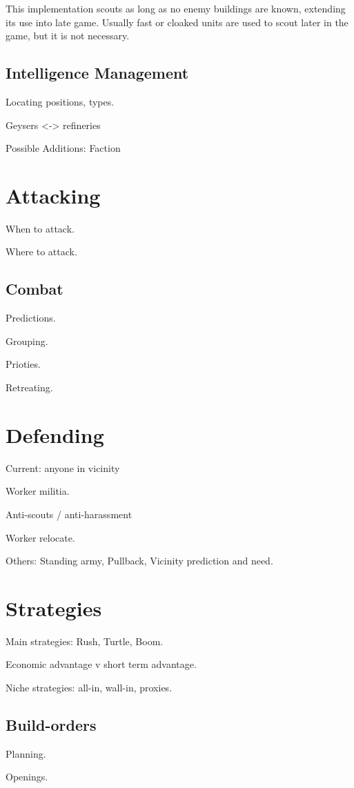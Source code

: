 		This implementation scouts as long as no enemy buildings are known, extending its use into late game. Usually fast or cloaked units are used to scout later in the game, but it is not necessary.
		
	\subsection{Intelligence Management}
	
	Locating positions, types.
	
	Geysers <-> refineries
	
	Possible Additions: Faction

\section{Attacking}

When to attack.

Where to attack.

	\subsection{Combat}
	
	Predictions.
	
	Grouping.
	
	Prioties.
	
	Retreating.
	
\section{Defending}

Current: anyone in vicinity

Worker militia.

Anti-scouts / anti-harassment

Worker relocate.

Others: Standing army, Pullback, Vicinity prediction and need.

\section{Strategies}

Main strategies: Rush, Turtle, Boom.

Economic advantage v short term advantage.

Niche strategies: all-in, wall-in, proxies.

\subsection{Build-orders}

Planning.

Openings.